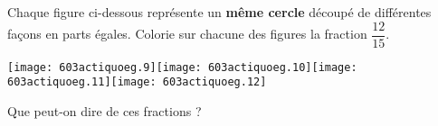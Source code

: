 \begin{myenumerate}
\item Chaque figure ci-dessous représente un {\bf même cercle} découpé
de différentes façons en parts égales. Colorie sur chacune des figures
la fraction $\dfrac{12}{15}$.
\par\texttt{[image: 603actiquoeg.9]}\hfill\texttt{[image: 603actiquoeg.10]}\hfill\texttt{[image: 603actiquoeg.11]}\hfill\texttt{[image: 603actiquoeg.12]}
\item\subitem{}\par{}
\item Que peut-on dire de ces fractions ? \dotfill\par\dotfill
\end{myenumerate}
